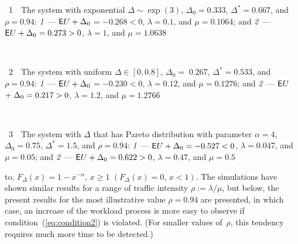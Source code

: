 \begin{multicols}{2}
    \vspace*{-2pt}

\noindent
{{\figurename~1}\ \ \small{The system with exponential $\Delta \sim \exp(3)$, 
$\Delta_0 = 0.333$, $\Delta^* = 0.667$, and $\rho = 0.94$: \textit{1}~--- 
${\sf E}U+\Delta_0$\protect\linebreak $=-0.268<0$, $\lambda=0.1$, and $\mu=0.1064$;
and \textit{2}~--- ${\sf E}U+\Delta_0=0.273>0$, $\lambda=1$, and $\mu=1.0638$}}



\vspace*{18pt}

\begin{center}  %
\mbox{%
 \epsfxsize=79.849mm
 }
  \end{center}

  \vspace*{-2pt}

\noindent
{{\figurename~2}\ \ \small{The system with uniform $\Delta \in [0,0.8]$, 
$\Delta_0$\protect\linebreak $ =\;0.267$, $\Delta^* = 0.533$, and $\rho = 0.94$: \textit{1}~--- 
${\sf E}U+\Delta_0$\protect\linebreak $=-0.230<0$, $\lambda=0.12$, and $\mu=0.1276$;
and \textit{2}~--- ${\sf E}U$\protect\linebreak $+\;\Delta_0\hm=0.217>0$, $\lambda=1.2$, 
and $\mu=1.2766$}}

\vspace*{18pt}

\begin{center}  %
 \mbox{%
 \epsfxsize=80.111mm
 }
  \end{center}

  \vspace*{-2pt}
  
  \noindent
{{\figurename~3}\ \ \small{The system with $\Delta$ that has Pareto distribution with parameter 
$\alpha=4$,
$\Delta_0 = 0.75$, $\Delta^* = 1.5$, and $\rho = 0.94$: \textit{1}~--- ${\sf E}U+\Delta_0=-0.527<0$,
$\lambda =0.047$, and $\mu=0.05$; and \textit{2}~--- ${\sf E}U+\Delta_0=0.622>0$,
$\lambda=0.47$, and $\mu=0.5$}}



\noindent
to,  $F_\Delta(x)=1-x^{-\alpha}$, $x\ge 1$ $(F_\Delta(x)=0,\,x<1)$.  
 The  simulations have shown  similar
results for   a range of traffic intensity $\rho:=\lambda/\mu$,
but below, the present results for the most illustrative {\large}
value $\rho = 0.94$ are presented, in which case,  an increase  of the workload
process is more easy to observe if condition~(\ref{eq:condition2}) is
violated. (For smaller values of~$\rho$, this tendency  requires much
more time to be detected.) 


\end{multicols}
